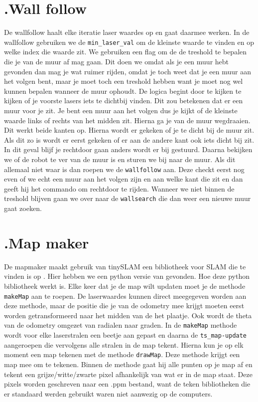 \documentclass[a4paper,10pt]{article}
\begin{document}
\section*{\label{wallfollow}\thesection.\quad Wall follow} De wallfollow haalt elke iteratie laser waardes op en gaat daarmee werken. In de wallfollow gebruiken we de \verb!min_laser_val! om de kleinste
waarde te vinden en op welke index die waarde zit. We gebruiken een flag om de
de treshold te bepalen die je van de muur af mag gaan. Dit doen we omdat als je een muur hebt gevonden dan mag je wat ruimer rijden, omdat je toch weet dat je een muur aan het volgen bent, maar je moet toch een treshold hebben want je moet nog wel kunnen bepalen wanneer de muur ophoudt. De logica begint door te kijken te kijken of je voorste lasers iets te dichtbij vinden. Dit zou betekenen dat er een muur voor je zit. Je bent een muur aan het volgen dus je kijkt of de kleinste waarde links of rechts van het midden zit. Hierna ga je van de muur wegdraaien. Dit werkt beide kanten op. Hierna wordt er gekeken of
je te dicht bij de muur zit. Als dit zo is wordt er eerst gekeken of  er aan de andere kant ook iets dicht bij zit. In dit geval blijf je rechtdoor gaan anders wordt er bij gestuurd. Daarna bekijken we of de robot te ver van de muur is en sturen we bij naar de muur. Als dit allemaal niet waar is dan roepen we de \verb!wallfollow! aan. Deze checkt eerst nog even of we echt een muur aan het volgen zijn en aan welke kant die zit en dan geeft hij het commando om rechtdoor te rijden. Wanneer we niet binnen de treshold blijven gaan we over naar de \verb!wallsearch! die dan weer een nieuwe muur gaat zoeken. 

\section*{\label{mapmaker}\thesection.\quad Map maker}
De mapmaker maakt gebruik van tinySLAM een bibliotheek voor SLAM die te vinden is op  \cite{openSLAM,CoreSLAM:article}. Hier hebben we een python versie\cite{CoreSLAM:python,} van gevonden. Hoe deze python bibliotheek werkt is. Elke keer dat je de map wilt
updaten moet je de methode \verb!makeMap! aan te roepen. De laserwaardes kunnen direct meegegeven worden aan deze methode, maar de positie die je van de
odometry mee krijgt moeten eerst worden getransformeerd naar het midden van de 
het plaatje. Ook wordt de theta van de odometry omgezet van radialen naar graden. In de \verb!makeMap! methode wordt voor elke laserstralen een beetje aan gepast en daarna de \verb!ts_map-update! aangeroepen die vervolgens
alle stralen in de map tekent. Hierna kun je op elk moment een map tekenen met
de methode \verb!drawMap!. Deze methode krijgt een map mee om te tekenen. Binnen de methode gaat hij alle punten op je map af en tekent een grijze/witte/zwarte pixel afhankelijk van wat er in de map staat. Deze pixels 
worden geschreven naar een .ppm bestand, want de teken bibliotheken die er 
standaard werden gebruikt waren niet aanwezig op de computers.
\end{document}
